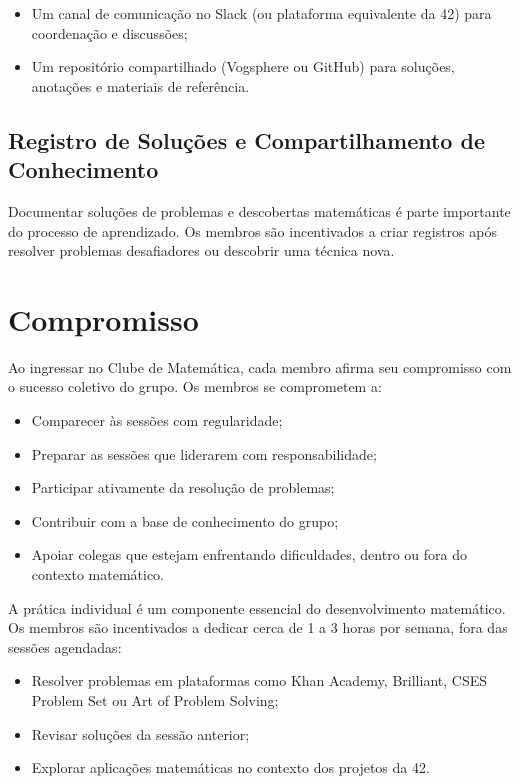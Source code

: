 \documentclass[12pt, a4paper]{article}
\begin{document}
\begin{itemize}
  \item Um canal de comunicação no Slack (ou plataforma equivalente da 42) para coordenação
    e discussões;
  \item Um repositório compartilhado (Vogsphere ou GitHub) para soluções, anotações e
    materiais de referência.
\end{itemize}

\subsection{Registro de Soluções e Compartilhamento de Conhecimento}

Documentar soluções de problemas e descobertas matemáticas é parte importante do processo
de aprendizado. Os membros são incentivados a criar registros após resolver problemas
desafiadores ou descobrir uma técnica nova.

\clearpage

\section{Compromisso}

Ao ingressar no Clube de Matemática, cada membro afirma seu compromisso com o sucesso
coletivo do grupo. Os membros se comprometem a:

\begin{itemize}
  \item Comparecer às sessões com regularidade;
  \item Preparar as sessões que liderarem com responsabilidade;
  \item Participar ativamente da resolução de problemas;
  \item Contribuir com a base de conhecimento do grupo;
  \item Apoiar colegas que estejam enfrentando dificuldades, dentro ou fora do contexto
    matemático.
\end{itemize}

A prática individual é um componente essencial do desenvolvimento matemático. Os membros
são incentivados a dedicar cerca de 1 a 3 horas por semana, fora das sessões agendadas:

\begin{itemize}
  \item Resolver problemas em plataformas como Khan Academy, Brilliant, CSES Problem Set
    ou Art of Problem Solving;
  \item Revisar soluções da sessão anterior;
  \item Explorar aplicações matemáticas no contexto dos projetos da 42.
\end{itemize}
\end{document}
